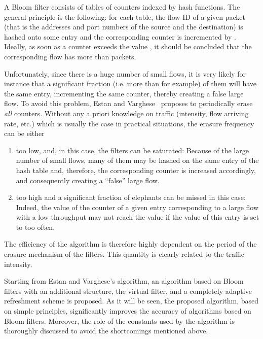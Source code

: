 \documentclass{amsart}
\begin{document}
A Bloom  filter consists of   tables  of counters indexed  by  hash  functions.  The
general principle is the following: for each table, the flow ID of a given packet (that is
the addresses and  port numbers of the source  and the destination) is hashed onto  some entry and
the corresponding counter is incremented by . Ideally, as soon as a counter exceeds the
value , it should  be concluded that the corresponding flow has  more than  packets.


Unfortunately, since there is a huge number of small flows, it is very likely for instance
that a significant fraction (i.e. more than  for example) of them will have the same
entry, incrementing the same counter, thereby creating a false large flow.
To  avoid  this  problem,  Estan  and Varghese~\cite{Varghese}  proposes  to  periodically erase
{\em all} counters. Without any a priori  knowledge on traffic (intensity,
flow arriving rate, etc.) which is usually the case in practical situations, the erasure  frequency can be either
\begin{enumerate}
\item too  low, and, in this case, the filters can be saturated:  Because of the large number of
  small flows, many of them may be   hashed on the same entry of the hash table and,
  therefore, the corresponding counter is increased accordingly,  and consequently
  creating a ``false'' large flow.   
\item too high and a significant fraction of elephants can be missed in this case: Indeed,
  the value of the counter of a given entry corresponding to a large  flow with a low
  throughput may not reach the value  if the value of this entry is set to  too often. 
\end{enumerate}
The  efficiency of  the  algorithm is therefore highly dependent on  the  period   of
the  erasure  mechanism of the filters. This quantity is clearly related to the traffic
intensity. 

Starting from Estan and Varghese's algorithm,  an algorithm  based on  Bloom filters with
an additional  structure, the virtual filter, and a completely adaptive  refreshment
scheme is proposed.  As it will be seen, the proposed algorithm, based on simple
principles, significantly improves  the accuracy of algorithms  based on  Bloom
filters. Moreover,  the role  of  the constants  used by  the algorithm is thoroughly
discussed to avoid the shortcomings mentioned above.  
\end{document}
